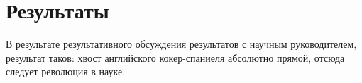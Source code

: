 \chapter{Результаты}
\label{results}

В результате результативного обсуждения результатов с научным руководителем, результат таков: хвост английского кокер-спаниеля абсолютно прямой, отсюда следует революция в науке.